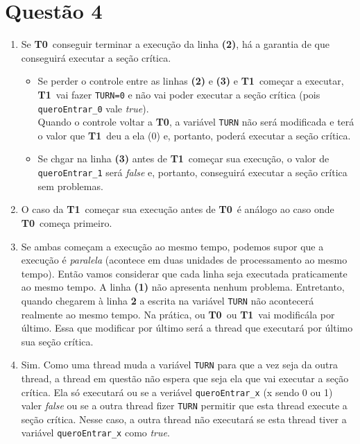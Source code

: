 \documentclass{article}
\newcommand{\Tz}{\textbf{T0}}
\newcommand{\Tu}{\textbf{T1}}
\begin{document}
\section*{Questão 4}

\begin{enumerate}[label=\textbf{\alph*)}]
	\item Se \Tz\ conseguir terminar a execução da linha \textbf{(2)}, há a garantia de que conseguirá
		executar a seção crítica.
		\begin{itemize}
			\item Se perder o controle entre as linhas \textbf{(2)} e \textbf{(3)} e \Tu\ começar a
				executar, \Tu\ vai fazer \texttt{TURN=0} e não vai poder executar a seção crítica (pois
				\texttt{queroEntrar\_0} vale \emph{true}).\\
				Quando o controle voltar a \Tz, a variável \texttt{TURN} não será modificada e terá o valor
				que \Tu\ deu a ela (0) e, portanto, poderá executar a seção crítica.
			\item Se chgar na linha \textbf{(3)} antes de \Tu\ começar sua execução, o valor de
				\texttt{queroEntrar\_1} será \emph{false} e, portanto, conseguirá executar a seção crítica
				sem problemas.
		\end{itemize}
	\item
		O caso da \Tu\ começar sua execução antes de \Tz\ é análogo ao caso onde \Tz\ começa primeiro.
	\item
		Se ambas começam a execução ao mesmo tempo, podemos supor que a execução é \emph{paralela} (acontece
		em duas unidades de processamento ao mesmo tempo). Então vamos considerar que cada linha seja executada
		praticamente ao mesmo tempo. A linha \textbf{(1)} não apresenta nenhum problema. Entretanto, quando
		chegarem à linha \textbf{2} a escrita na variável \texttt{TURN} não acontecerá realmente ao mesmo tempo.
		Na prática, ou \Tz\ ou \Tu\ vai modificála por último. Essa que modificar por último será a thread que
		executará por último sua seção crítica.
	\item
		Sim. Como uma thread muda a variável \texttt{TURN} para que a vez seja da outra thread, a thread em
		questão não espera que seja ela que vai executar a seção crítica. Ela só executará ou se a veriável
		\texttt{queroEntrar\_x} (x sendo 0 ou 1) valer \emph{false} ou se a outra thread fizer
		\texttt{TURN} permitir que esta thread execute a seção crítica. Nesse caso, a outra thread não executará
		se esta thread tiver a variável \texttt{queroEntrar\_x} como \emph{true}.
\end{enumerate}
\end{document}
